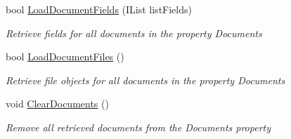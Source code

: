 \begin{DoxyCompactItemize}
bool \mbox{\hyperlink{class_database_object_a8a64b91e2e4228b2fc552e51959987c4}{Load\+Document\+Fields}} (I\+List list\+Fields)
\begin{DoxyCompactList}\small\item\em Retrieve fields for all documents in the property \textquotesingle{}Documents\textquotesingle{} \end{DoxyCompactList}\item 
bool \mbox{\hyperlink{class_database_object_acdf5c9ee898d4473350a2f4878af5a23}{Load\+Document\+Files}} ()
\begin{DoxyCompactList}\small\item\em Retrieve file objects for all documents in the property \textquotesingle{}Documents\textquotesingle{} \end{DoxyCompactList}\item 
void \mbox{\hyperlink{class_database_object_af9c4789dea0a14e5a2f914758d3bc54e}{Clear\+Documents}} ()
\begin{DoxyCompactList}\small\item\em Remove all retrieved documents from the \textquotesingle{}Documents\textquotesingle{} property \end{DoxyCompactList}\end{DoxyCompactItemize}
